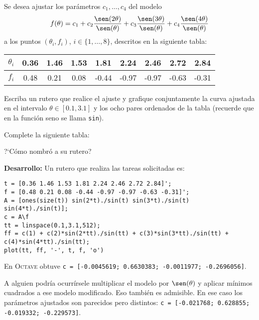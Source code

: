 Se desea ajustar los par\'ametros $c_1, \dotsc, c_4$ del modelo
%
\begin{equation*}
f(\theta) = c_1 + c_2 \frac{\sen(2\theta)}{\sen(\theta)} + c_3 \frac{\sen(3\theta)}{\sen(\theta)} + c_4 \frac{\sen(4\theta)}{\sen(\theta)}
\end{equation*}
%
a los puntos $(\theta_i, f_i)$, $i \in \{1, \dotsc, 8\}$, descritos en la siguiente tabla:
%
\begin{center}
\begin{tabular}{c|cccccccc}
$\theta_i$ & 0.36 & 1.46 & 1.53 & 1.81 & 2.24 & 2.46 & 2.72 & 2.84\\\hline
$f_i$ & 0.48 & 0.21 & 0.08 & -0.44 & -0.97 & -0.97 & -0.63 & -0.31
\end{tabular}
\end{center}

Escriba un rutero \matlab que realice el ajuste y grafique conjuntamente la curva ajustada en el intervalo $\theta \in [0.1,3.1]$ y los ocho pares ordenados de la tabla (recuerde que en \matlab la funci\'on seno se llama \texttt{sin}).

Complete la siguiente tabla:


\medskip
\noindent ?`C\'omo nombr\'o a su rutero?\newline
{}

\textbf{Desarrollo:} Un rutero que realiza las tareas solicitadas es:
\begin{lstlisting}
t = [0.36 1.46 1.53 1.81 2.24 2.46 2.72 2.84]';
f = [0.48 0.21 0.08 -0.44 -0.97 -0.97 -0.63 -0.31]';
A = [ones(size(t)) sin(2*t)./sin(t) sin(3*t)./sin(t) sin(4*t)./sin(t)];
c = A\f
tt = linspace(0.1,3.1,512);
ff = c(1) + c(2)*sin(2*tt)./sin(tt) + c(3)*sin(3*tt)./sin(tt) + c(4)*sin(4*tt)./sin(tt);
plot(tt, ff, '-', t, f, 'o')
\end{lstlisting}

En \textsc{Octave} obtuve \texttt{c = [-0.0045619; 0.6630383; -0.0011977; -0.2696056]}.

A alguien podría ocurr\'irsele multiplicar el modelo por $\sen(\theta)$ y aplicar m\'inimos cuadrados a ese modelo modificado.
Eso tambi\'en es admisible.
En ese caso los par\'ametros ajustados son parecidos pero distintos: \texttt{c = [-0.021768; 0.628855; -0.019332; -0.229573]}.


